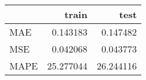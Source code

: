 \begin{tabular}{lrr}
\toprule
{} &      train &       test \\
\midrule
MAE  &   0.143183 &   0.147482 \\
MSE  &   0.042068 &   0.043773 \\
MAPE &  25.277044 &  26.244116 \\
\bottomrule
\end{tabular}
